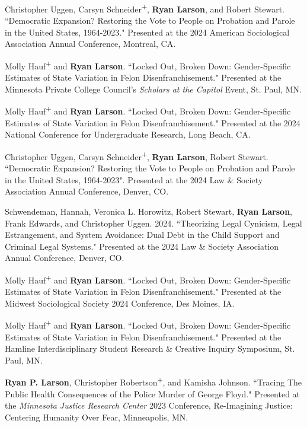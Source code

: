 \documentclass[letterpaper]{article}
\newenvironment{publist}{%
  \begin{list}{}{%
    \setlength{\leftmargin}{0cm}   %
    \setlength{\labelwidth}{2cm}     %
    \setlength{\labelsep}{0.5cm}     %
  }%
}{%
  \end{list}%
}
\begin{document}
\begin{publist}
\item Christopher Uggen, Carsyn Schneider\textsuperscript{+}, \textbf{Ryan Larson}, and Robert Stewart. ``Democratic Expansion? Restoring the Vote to People on Probation and Parole in the United States, 1964-2023." Presented at the 2024 American Sociological Association Annual Conference, Montreal, CA. 

\item Molly Hauf\textsuperscript{+} and \textbf{Ryan Larson}. ``Locked Out, Broken Down: Gender-Specific Estimates of State Variation in Felon Disenfranchisement." Presented at the Minnesota Private College Council's \textit{Scholars at the Capitol} Event, St. Paul, MN. 

\item Molly Hauf\textsuperscript{+} and \textbf{Ryan Larson}. ``Locked Out, Broken Down: Gender-Specific Estimates of State Variation in Felon Disenfranchisement." Presented at the 2024 National Conference for Undergraduate Research, Long Beach, CA. 

\item Christopher Uggen, Carsyn Schneider\textsuperscript{+}, \textbf{Ryan Larson}, Robert Stewart. ``Democratic Expansion? Restoring the Vote to People on Probation and Parole in the United States, 1964-2023". Presented at the 2024 Law \& Society Association Annual Conference, Denver, CO. 

\item Schwendeman, Hannah, Veronica L. Horowitz, Robert Stewart, \textbf{Ryan Larson}, Frank Edwards, and Christopher Uggen. 2024.  ``Theorizing Legal Cynicism, Legal Estrangement, and System Avoidance: Dual Debt in the Child Support and Criminal Legal Systems." Presented at the 2024 Law \& Society Association Annual Conference, Denver, CO. 

\item Molly Hauf\textsuperscript{+} and \textbf{Ryan Larson}. ``Locked Out, Broken Down: Gender-Specific Estimates of State Variation in Felon Disenfranchisement." Presented at the Midwest Sociological Society 2024 Conference, Des Moines, IA. 

\item Molly Hauf\textsuperscript{+} and \textbf{Ryan Larson}. ``Locked Out, Broken Down: Gender-Specific Estimates of State Variation in Felon Disenfranchisement." Presented at the Hamline Interdisciplinary Student Research \& Creative Inquiry Symposium, St. Paul, MN. 

\item[\textbf{2023}] \textbf{Ryan P. Larson}, Christopher Robertson\textsuperscript{+}, and Kamisha Johnson. ``Tracing The Public Health Consequences of the Police Murder of George Floyd." Presented at the \textit{Minnesota Justice Research Center} 2023 Conference, Re-Imagining Justice: Centering Humanity Over Fear, Minneapolis, MN.   


\end{publist}
\end{document}
